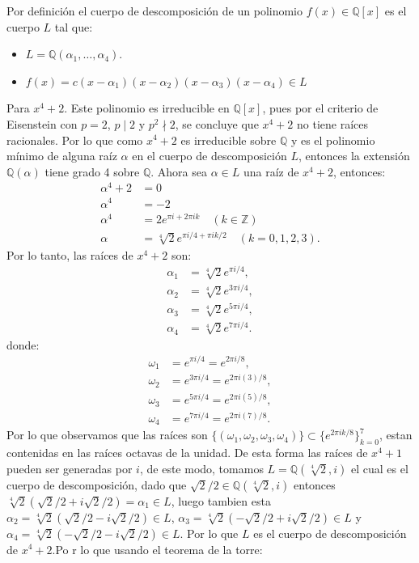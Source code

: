\begin{solucion}
Por definición el cuerpo de descomposición de un polinomio \(f(x) \in \mathbb{Q}[x]\) es el cuerpo \(L\) tal que:
\begin{itemize}
    \item \(L = \mathbb{Q}(\alpha_1, \ldots, \alpha_4)\).
    \item $f(x) = c(x - \alpha_1)(x - \alpha_2)(x - \alpha_3)(x - \alpha_4) \in L$
\end{itemize}
Para \(x^4 + 2\). Este polinomio es irreducible en \(\mathbb{Q}[x]\), pues por el criterio de Eisenstein con \(p=2\), $p \mid 2$ y \(p^2 \nmid 2\), se concluye que \(x^4 + 2\) no tiene raíces racionales. Por lo que como $x^4 + 2$ es irreducible sobre \(\mathbb{Q}\) y es el polinomio mínimo de alguna raíz \(\alpha\) en el cuerpo de descomposición $L$, entonces la extensión \(\mathbb{Q}(\alpha)\) tiene grado 4 sobre \(\mathbb{Q}\).
Ahora sea $\alpha \in L$ una raíz de $x^4 + 2$, entonces:
\begin{align*}
    \alpha^4 + 2 &= 0 \\
    \alpha^4 &= -2 \\
    \alpha^4 &= 2e^{\pi i + 2\pi i k} \quad (k \in \mathbb{Z}) \\
    \alpha &= \sqrt[4]{2}e^{\pi i/4 + \pi i k/2} \quad (k = 0, 1, 2, 3).
\end{align*}
Por lo tanto, las raíces de \(x^4 + 2\) son:
\begin{align*}
    \alpha_1 &= \sqrt[4]{2}e^{\pi i/4}, \\
    \alpha_2 &= \sqrt[4]{2}e^{3\pi i/4}, \\
    \alpha_3 &= \sqrt[4]{2}e^{5\pi i/4}, \\
    \alpha_4 &= \sqrt[4]{2}e^{7\pi i/4}.
\end{align*}
donde:
\begin{align*}
    \omega_1 &= e^{\pi i/4}= e^{2\pi i/8}, \\
    \omega_2 &= e^{3\pi i/4}= e^{2\pi i(3)/8}, \\
    \omega_3 &= e^{5\pi i/4}= e^{2\pi i(5)/8}, \\
    \omega_4 &= e^{7\pi i/4}= e^{2\pi i(7)/8}.
\end{align*}
Por lo que observamos que las raíces son $\{(\omega_1, \omega_2, \omega_3, \omega_4) \} \subset \{e^{2\pi i k/8}\}_{k=0}^{7}$, estan contenidas en las raíces octavas de la unidad. De esta forma las raíces de \(x^4 + 1\) pueden ser generadas por $i$, de este modo, tomamos $L=\mathbb{Q}(\sqrt[4]{2}, i)$ el cual es el cuerpo de descomposición, dado que $\sqrt{2}/2 \in \mathbb{Q}(\sqrt[4]{2}, i)$ entonces $\sqrt[4]{2} (\sqrt{2}/2 + i \sqrt{2}/2) = \alpha_1 \in L$, luego tambien esta $\alpha_2 = \sqrt[4]{2} (\sqrt{2}/2 - i \sqrt{2}/2) \in L$, $\alpha_3 = \sqrt[4]{2} (-\sqrt{2}/2 + i \sqrt{2}/2) \in L$ y $\alpha_4 = \sqrt[4]{2} (-\sqrt{2}/2 - i \sqrt{2}/2) \in L$. Por lo que $L$ es el cuerpo de descomposición de \(x^4 + 2\).Po r lo que usando el teorema de la torre:

\end{solucion}

